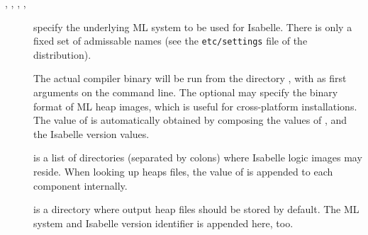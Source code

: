 \begin{isabellebody}
\begin{isamarkuptext}
\begin{description}
  \item[\hypertarget{setting.ML-SYSTEM}{\hyperlink{setting.ML-SYSTEM}{\mbox{}}}, \hypertarget{setting.ML-HOME}{\hyperlink{setting.ML-HOME}{\mbox{}}},
  \hypertarget{setting.ML-OPTIONS}{\hyperlink{setting.ML-OPTIONS}{\mbox{}}}, \hypertarget{setting.ML-PLATFORM}{\hyperlink{setting.ML-PLATFORM}{\mbox{}}}, \hypertarget{setting.ML-IDENTIFIER}{\hyperlink{setting.ML-IDENTIFIER}{\mbox{}}}\isa{{\isachardoublequote}\isactrlsup {\isacharasterisk}{\isachardoublequote}}] specify the underlying ML system
  to be used for Isabelle.  There is only a fixed set of admissable
  \hyperlink{setting.ML-SYSTEM}{\mbox{}} names (see the \verb|etc/settings| file
  of the distribution).
  
  The actual compiler binary will be run from the directory \hyperlink{setting.ML-HOME}{\mbox{}}, with \hyperlink{setting.ML-OPTIONS}{\mbox{}} as first arguments on the
  command line.  The optional \hyperlink{setting.ML-PLATFORM}{\mbox{}} may specify the
  binary format of ML heap images, which is useful for cross-platform
  installations.  The value of \hyperlink{setting.ML-IDENTIFIER}{\mbox{}} is
  automatically obtained by composing the values of \hyperlink{setting.ML-SYSTEM}{\mbox{}}, \hyperlink{setting.ML-PLATFORM}{\mbox{}} and the Isabelle version values.
  
  \item[\hypertarget{setting.ISABELLE-PATH}{\hyperlink{setting.ISABELLE-PATH}{\mbox{}}}] is a list of directories
  (separated by colons) where Isabelle logic images may reside.  When
  looking up heaps files, the value of \hyperlink{setting.ML-IDENTIFIER}{\mbox{}} is
  appended to each component internally.
  
  \item[\hypertarget{setting.ISABELLE-OUTPUT}{\hyperlink{setting.ISABELLE-OUTPUT}{\mbox{}}}\isa{{\isachardoublequote}\isactrlsup {\isacharasterisk}{\isachardoublequote}}] is a
  directory where output heap files should be stored by default. The
  ML system and Isabelle version identifier is appended here, too.
  

\end{description}
\end{isamarkuptext}
\end{isabellebody}
